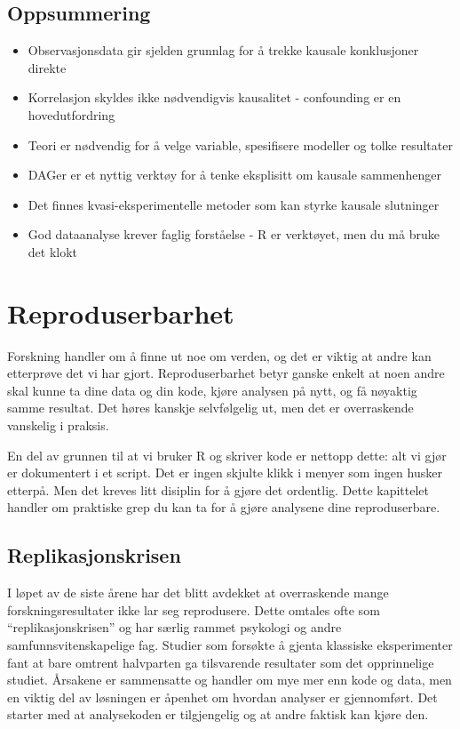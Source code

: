 \documentclass[
  norsk,
  letterpaper,
  DIV=11,
  numbers=noendperiod]{scrreprt}
\providecommand{\tightlist}{%
  \setlength{\itemsep}{0pt}\setlength{\parskip}{0pt}}
\theoremstyle{definition}
\theoremstyle{remark}
\begin{document}
\section{Oppsummering}\label{oppsummering-6}

\begin{itemize}
\tightlist
\item
  Observasjonsdata gir sjelden grunnlag for å trekke kausale
  konklusjoner direkte
\item
  Korrelasjon skyldes ikke nødvendigvis kausalitet - confounding er en
  hovedutfordring
\item
  Teori er nødvendig for å velge variable, spesifisere modeller og tolke
  resultater
\item
  DAGer er et nyttig verktøy for å tenke eksplisitt om kausale
  sammenhenger
\item
  Det finnes kvasi-eksperimentelle metoder som kan styrke kausale
  slutninger
\item
  God dataanalyse krever faglig forståelse - R er verktøyet, men du må
  bruke det klokt
\end{itemize}

\chapter{Reproduserbarhet}\label{reproduserbarhet}

Forskning handler om å finne ut noe om verden, og det er viktig at andre
kan etterprøve det vi har gjort. Reproduserbarhet betyr ganske enkelt at
noen andre skal kunne ta dine data og din kode, kjøre analysen på nytt,
og få nøyaktig samme resultat. Det høres kanskje selvfølgelig ut, men
det er overraskende vanskelig i praksis.

En del av grunnen til at vi bruker R og skriver kode er nettopp dette:
alt vi gjør er dokumentert i et script. Det er ingen skjulte klikk i
menyer som ingen husker etterpå. Men det kreves litt disiplin for å
gjøre det ordentlig. Dette kapittelet handler om praktiske grep du kan
ta for å gjøre analysene dine reproduserbare.

\section{Replikasjonskrisen}\label{replikasjonskrisen}

I løpet av de siste årene har det blitt avdekket at overraskende mange
forskningsresultater ikke lar seg reprodusere. Dette omtales ofte som
``replikasjonskrisen'' og har særlig rammet psykologi og andre
samfunnsvitenskapelige fag. Studier som forsøkte å gjenta klassiske
eksperimenter fant at bare omtrent halvparten ga tilsvarende resultater
som det opprinnelige studiet. Årsakene er sammensatte og handler om mye
mer enn kode og data, men en viktig del av løsningen er åpenhet om
hvordan analyser er gjennomført. Det starter med at analysekoden er
tilgjengelig og at andre faktisk kan kjøre den.
\end{document}

